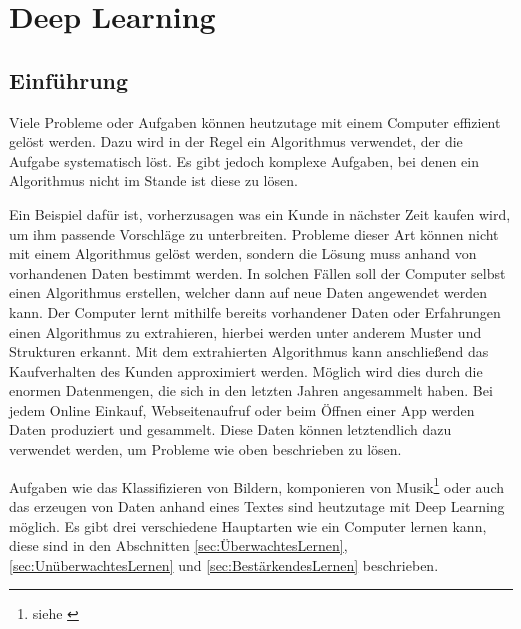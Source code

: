 \section{Deep Learning}
\subsection{Einführung}
Viele Probleme oder Aufgaben können heutzutage mit einem Computer effizient gelöst werden. Dazu wird in der Regel ein \gls{Algorithmus} verwendet, der die Aufgabe systematisch löst. Es gibt jedoch komplexe Aufgaben, bei denen ein \gls{Algorithmus} nicht im Stande ist diese zu lösen.

Ein Beispiel dafür ist, vorherzusagen was ein Kunde in nächster Zeit kaufen wird, um ihm passende Vorschläge zu unterbreiten. Probleme dieser Art können nicht mit einem Algorithmus gelöst werden, sondern die Lösung muss anhand von vorhandenen Daten bestimmt werden. In solchen Fällen soll der Computer selbst einen Algorithmus erstellen, welcher dann auf neue Daten angewendet werden kann. Der Computer lernt mithilfe bereits vorhandener Daten oder Erfahrungen einen Algorithmus zu extrahieren, hierbei werden unter anderem Muster und Strukturen erkannt. Mit dem extrahierten Algorithmus kann anschließend das Kaufverhalten des Kunden approximiert werden. Möglich wird dies durch die enormen Datenmengen, die sich in den letzten Jahren angesammelt haben. Bei jedem Online Einkauf, Webseitenaufruf oder  beim Öffnen einer App werden Daten produziert und gesammelt. Diese Daten können letztendlich dazu verwendet werden, um Probleme wie oben beschrieben zu lösen.\cite[vgl.][]{Alpaydin2014}

Aufgaben wie das Klassifizieren von Bildern, komponieren von Musik\footnote{siehe \cite{GoogleMusicLM} } oder auch das erzeugen von Daten anhand eines Textes sind heutzutage mit Deep Learning möglich. Es gibt drei verschiedene Hauptarten wie ein Computer lernen kann, diese sind in den Abschnitten \ref{sec:ÜberwachtesLernen}, \ref{sec:UnüberwachtesLernen} und \ref{sec:BestärkendesLernen} beschrieben.


